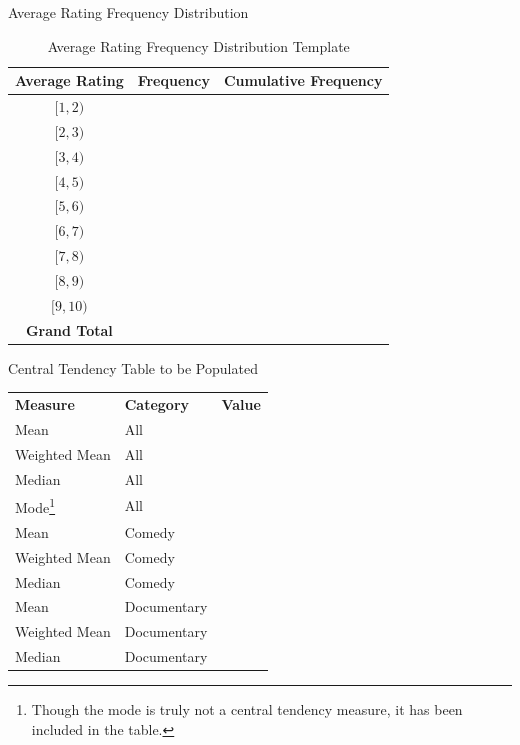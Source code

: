 \documentclass[pdf]{beamer}
\theoremstyle{remark}
\theoremstyle{definition}
\begin{document}
\begin{frame}[t]{Average Rating Frequency Distribution}
\small
\begin{table}[htbp]
  \centering
  \captionsetup{justification=centering}
    \begin{tabular}{crr}
    \rowcolor[rgb]{ .851,  .882,  .949} \textbf{Average Rating} & \multicolumn{1}{l}{\textbf{Frequency}} &  \multicolumn{1}{l}{\textbf{Cumulative Frequency}}\\
    \midrule
   $[1,2)$   &  & \\
   $[2,3)$   &  & \\
   $[3,4)$   &  & \\
   $[4,5)$   &  & \\
   $[5,6)$   &  & \\
   $[6,7)$   &  & \\
   $[7,8)$  &  &  \\
   $[8,9)$   &  &  \\
    $[9,10)$  &  &  \\
    \midrule
    \rowcolor[rgb]{ .851,  .882,  .949} \textbf{Grand Total} &  & \\
    \end{tabular}%
    \caption{Average Rating Frequency Distribution Template}
  \label{tab:4}%
\end{table}%
\vspace{-2ex}
\normalsize
\end{frame}

\begin{frame}[t]{Central Tendency Table to be Populated}

\begin{table}[htbp]
  \centering
  \captionsetup{justification=centering}
    \begin{tabular}{llr}
    \rowcolor[rgb]{ .851,  .882,  .949} \textbf{Measure} & \textbf{Category} & \multicolumn{1}{l}{\textbf{Value}} \\
    Mean  & All   &  \\
    Weighted Mean & All   &  \\
    Median & All   &  \\
    Mode\footnote{Though the mode is truly not a central tendency measure, it has been included in the table.}  & All   &  \\
    Mean  & Comedy &  \\
    Weighted Mean & Comedy &  \\
    Median & Comedy &  \\
    Mean  & Documentary &  \\
    Weighted Mean & Documentary &  \\
    Median & Documentary &  \\
    \end{tabular}%
\end{table}%
\end{frame}
\end{document}
